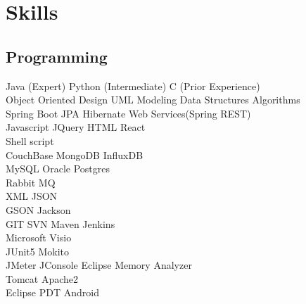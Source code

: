 \documentclass[]{kushal-resume}
\begin{document}
\begin{minipage}[t]{0.33\textwidth}

\section{Skills}
\subsection{Programming}
Java (Expert) \textbullet{} Python (Intermediate) \textbullet{} C (Prior Experience) \\
Object Oriented Design  \textbullet{} UML Modeling \textbullet{} Data Structures \textbullet{} Algorithms \\
Spring Boot \textbullet{} JPA \textbullet{} Hibernate \textbullet{} Web Services(Spring REST) \\
Javascript \textbullet{} JQuery \textbullet{} HTML \textbullet{} React \\
Shell script \\
CouchBase \textbullet{} MongoDB \textbullet{} InfluxDB  \\
MySQL \textbullet{} Oracle \textbullet{} Postgres \\
Rabbit MQ \\
XML \textbullet{} JSON \\
GSON \textbullet{} Jackson \\
GIT \textbullet{} SVN \textbullet{} Maven \textbullet{} Jenkins \\
Microsoft Visio \\
JUnit5 \textbullet{} Mokito \\
JMeter \textbullet{} JConsole \textbullet{} Eclipse Memory Analyzer \\
Tomcat \textbullet{} Apache2 \\
Eclipse PDT \textbullet{} Android \\
\sectionsep


%
%

\end{minipage} 
\hfill
\end{document}
